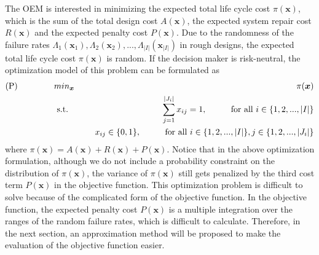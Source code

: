 \documentclass[preprint,12pt]{elsarticle}
\begin{document}

The OEM is interested in minimizing the expected total life cycle cost $\pi(\boldsymbol{x})$, which is the sum of the total design cost $A(\boldsymbol{x})$, the expected system repair cost $R(\boldsymbol{x})$ and the expected penalty cost $P(\boldsymbol{x})$. Due to the randomness of the failure rates $\Lambda_{1}(\boldsymbol{x}_{1}),\Lambda_{2}(\boldsymbol{x}_{2}),...,\Lambda_{\lvert I \rvert}(\boldsymbol{x}_{\lvert I \rvert})$ in rough designs, the expected total life cycle cost $\pi(\boldsymbol{x})$ is random. If the decision maker is risk-neutral, the optimization model of this problem can be formulated as
\begin{eqnarray}
\text{(P)} \hspace{15mm} & min_{\boldsymbol{x}} & \hspace{10mm} \pi(\boldsymbol{x}) \nonumber\\
& \text{ s.t. }&  \hspace{5mm} \sum_{j=1}^{\lvert J_{i}\rvert }{x_{ij}}=1, \hspace{10mm} \text{for all $i$}  \in \{1,2,...,\lvert I \rvert \} \nonumber\\
& & \hspace{5mm} x_{ij} \in \{0,1\}, \hspace{10mm}  \text{for all $i$}  \in \{1,2,...,\lvert I\rvert\}, j \in \{1,2,...,\lvert J_{i}\rvert\}
\end{eqnarray}
where $\pi(\boldsymbol{x})=A(\boldsymbol{x})+R(\boldsymbol{x})+P(\boldsymbol{x})$. Notice that in the above optimization formulation, although we do not include a probability constraint on the distribution of $\pi(\boldsymbol{x})$, the variance of $\pi(\boldsymbol{x})$ still gets penalized by the third cost term $P(\boldsymbol{x})$ in the objective function. This optimization problem is difficult to solve because of the complicated form of the objective function. In the objective function, the expected penalty cost $P(\boldsymbol{x})$ is a multiple integration over the ranges of the random failure rates, which is difficult to calculate. Therefore, in the next section, an approximation method will be proposed to make the evaluation of the objective function easier.
\end{document}
